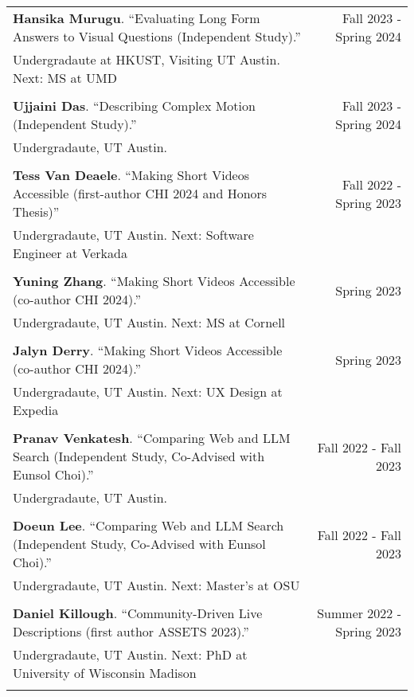 \begin{longtable}{Xr}
	\textbf{Hansika Murugu}. ``Evaluating Long Form Answers to Visual Questions (Independent Study).'' & Fall 2023 - Spring 2024 \\
	Undergradaute at HKUST, Visiting UT Austin. Next: MS at UMD &  \\
	\\

	\textbf{Ujjaini Das}. ``Describing Complex Motion (Independent Study).'' & Fall 2023 - Spring 2024 \\
	Undergradaute, UT Austin. &  \\
	\\

	\textbf{Tess Van Deaele}. ``Making Short Videos Accessible (first-author CHI 2024 and Honors Thesis)'' & Fall 2022 - Spring 2023 \\
	Undergradaute, UT Austin. Next: Software Engineer at Verkada &  \\
	\\

	\textbf{Yuning Zhang}. ``Making Short Videos Accessible (co-author CHI 2024).'' & Spring 2023 \\
	Undergradaute, UT Austin. Next: MS at Cornell &  \\
	\\

	\textbf{Jalyn Derry}. ``Making Short Videos Accessible (co-author CHI 2024).'' & Spring 2023 \\
	Undergradaute, UT Austin. Next: UX Design at Expedia &  \\
	\\

	\textbf{Pranav Venkatesh}. ``Comparing Web and LLM Search (Independent Study, Co-Advised with Eunsol Choi).'' & Fall 2022 - Fall 2023 \\
	Undergradaute, UT Austin. &  \\
	\\

	\textbf{Doeun Lee}. ``Comparing Web and LLM Search (Independent Study, Co-Advised with Eunsol Choi).'' & Fall 2022 - Fall 2023 \\
	Undergradaute, UT Austin. Next: Master's at OSU &  \\
	\\

	\textbf{Daniel Killough}. ``Community-Driven Live Descriptions (first author ASSETS 2023).'' & Summer 2022 - Spring 2023 \\
	Undergradaute, UT Austin. Next: PhD at University of Wisconsin Madison &  \\
	\\


\end{longtable}
